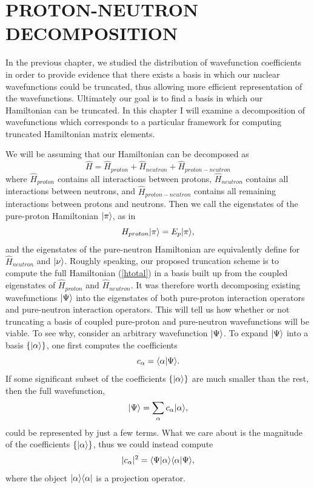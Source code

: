 \chapter{PROTON-NEUTRON DECOMPOSITION}
\label{chap:decomp}

In the previous chapter, we studied the distribution of wavefunction coefficients
in order to provide evidence that there exists a basis in which our nuclear
wavefunctions could be truncated, thus allowing more efficient representation
of the wavefunctions. Ultimately our goal is to find a basis in which our 
Hamiltonian can be truncated.
In this chapter I will examine a decomposition of wavefunctions which
corresponds to a particular framework for computing truncated Hamiltonian matrix
elements.

We will be assuming that our Hamiltonian can be decomposed as
\begin{equation}\label{htotal}
	\hat{H} = \hat{H}_{proton} + \hat{H}_{neutron} + \hat{H}_{proton-neutron}
\end{equation}
where $\hat{H}_{proton}$ contains all interactions between protons, 
$\hat{H}_{neutron}$ contains all interactions between neutrons, and $\hat{H}_{proton-neutron}$ contains
all remaining interactions between protons and neutrons. Then we call the 
eigenstates of the pure-proton Hamiltonian $|\pi\rangle$, as in
\begin{equation}\label{hppp}
	H_{proton}|\pi\rangle = E_p|\pi\rangle,
\end{equation}
and the eigenstates of the pure-neutron Hamiltonian are equivalently
define for $\hat{H}_{neutron}$ and $|\nu\rangle$. 
Roughly speaking, our proposed truncation 
scheme is to compute the full Hamiltonian (\ref{htotal}) in a basis
built up from the coupled eigenstates of $\hat{H}_{proton}$ and $\hat{H}_{neutron}$.
It was therefore worth decomposing existing wavefunctions $|\Psi\rangle$
into the eigenstates of both pure-proton interaction operators and 
pure-neutron interaction operators. This will tell us how whether or not
truncating a basis of coupled pure-proton and pure-neutron wavefunctions
will be viable. To see why, consider an arbitrary wavefunction $|\Psi\rangle$.
To expand $|\Psi\rangle$ into a basis $\{|\alpha\rangle\}$, one first computes the
coefficients
\begin{equation}
    c_\alpha = \langle \alpha|\Psi\rangle.
\end{equation}
If some significant subset of the coefficients $\{|\alpha\rangle\}$ are much smaller than the rest,
then the full wavefunction,
\begin{equation}
    |\Psi\rangle = \sum_\alpha c_\alpha |\alpha\rangle,
\end{equation}
could be represented by just a few terms. What we care about is the magnitude of
the coefficients $\{|\alpha\rangle\}$, thus we could instead compute
\begin{equation}\label{coef2}
    |c_\alpha|^2 = \langle \Psi|\alpha\rangle\langle \alpha|\Psi\rangle,
\end{equation}
where the object $|\alpha\rangle\langle \alpha|$ is a projection operator.

